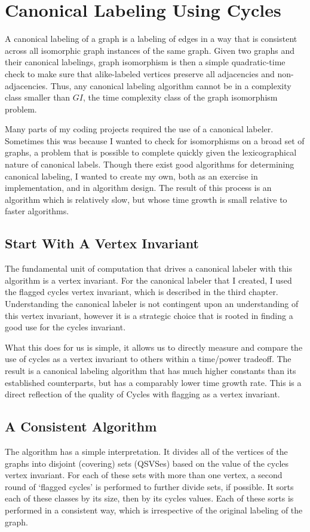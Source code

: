 \chapter{Canonical Labeling Using Cycles}

A canonical labeling of a graph is a labeling of edges in a way that is consistent across all isomorphic graph instances of the same graph.
Given two graphs and their canonical labelings, graph isomorphism is then a simple quadratic-time check to make sure that alike-labeled vertices preserve all adjacencies and non-adjacencies. 
Thus, any canonical labeling algorithm cannot be in a complexity class smaller than $GI$, the time complexity class of the graph isomorphism problem.

Many parts of my coding projects required the use of a canonical labeler.
Sometimes this was because I wanted to check for isomorphisms on a broad set of graphs, a problem that is possible to complete quickly given the lexicographical nature of canonical labels.
Though there exist good algorithms for determining canonical labeling, I wanted to create my own, both as an exercise in implementation, and in algorithm design.
The result of this process is an algorithm which is relatively slow, but whose time growth is small relative to faster algorithms.

\section{Start With A Vertex Invariant}

The fundamental unit of computation that drives a canonical labeler with this algorithm is a vertex invariant.
For the canonical labeler that I created, I used the flagged cycles vertex invariant, which is described in the third chapter.
Understanding the canonical labeler is not contingent upon an understanding of this vertex invariant, however it is a strategic choice that is rooted in finding a good use for the cycles invariant.

What this does for us is simple, it allows us to directly measure and compare the use of cycles as a vertex invariant to others within a time/power tradeoff.
The result is a canonical labeling algorithm that has much higher constants than its established counterparts, but has a comparably lower time growth rate. 
This is a direct reflection of the quality of Cycles with flagging as a vertex invariant.

\section{A Consistent Algorithm}
The algorithm has a simple interpretation. 
It divides all of the vertices of the graphs into disjoint (covering) sets (QSVSes) based on the value of the cycles vertex invariant.
For each of these sets with more than one vertex, a second round of `flagged cycles' is performed to further divide sets, if possible.
It sorts each of these classes by its size, then by its cycles values.
Each of these sorts is performed in a consistent way, which is irrespective of the original labeling of the graph.

